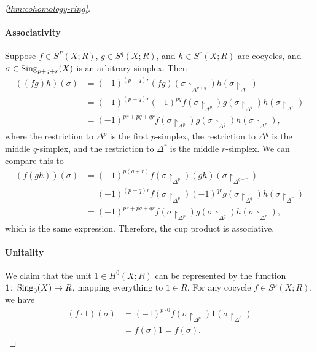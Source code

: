 \documentclass{standalone}
\begin{document}
\begin{proof}[\cref{thm:cohomology-ring}]
  \paragraph{Associativity}
  Suppose \(f \in S^P(X; R)\), \(g \in S^q(X; R)\), and \(h \in S^r(X; R)\)
  are cocycles, and \(\sigma \in \operatorname{Sing}_{p+q+r}(X)\) is an arbitrary simplex.
  Then
  \begin{align*}
    ((fg)h)(\sigma)
      &= (-1)^{(p+q)r} (fg)(\sigma{\restriction}_{\Delta^{p+q}})
                         h (\sigma{\restriction}_{\Delta^r}) \\
      &= (-1)^{(p+q)r} (-1)^{pq} f(\sigma{\restriction}_{\Delta^p})
                                 g(\sigma{\restriction}_{\Delta^q})
                                 h(\sigma{\restriction}_{\Delta^r}) \\
      &= (-1)^{pr + pq + qr} f(\sigma{\restriction}_{\Delta^p})
                             g(\sigma{\restriction}_{\Delta^q})
                             h(\sigma{\restriction}_{\Delta^r}),
  \end{align*}
  where the restriction to \(\Delta^p\) is the first \(p\)-simplex,
        the restriction to \(\Delta^q\) is the middle \(q\)-simplex, and
        the restriction to \(\Delta^r\) is the middle \(r\)-simplex.
  We can compare this to
  \begin{align*}
    (f(gh))(\sigma)
      &= (-1)^{p(q+r)}    f(\sigma{\restriction}_{\Delta^p})
                       (gh)(\sigma{\restriction}_{\Delta^{q+r}}) \\
      &= (-1)^{(p+q)r}           f(\sigma{\restriction}_{\Delta^p})
                       (-1)^{qr} g(\sigma{\restriction}_{\Delta^q})
                                 h(\sigma{\restriction}_{\Delta^r}) \\
      &= (-1)^{pr + pq + qr} f(\sigma{\restriction}_{\Delta^p})
                             g(\sigma{\restriction}_{\Delta^q})
                             h(\sigma{\restriction}_{\Delta^r}),
  \end{align*}
  which is the same expression.
  Therefore, the cup product is associative.
  

  \paragraph{Unitality}
  We claim that the unit \(1 \in H^0(X; R)\) can be represented by
  the function \(1 \colon \operatorname{Sing}_0(X) \to R\),
  mapping everything to \(1 \in R\).
  For any cocycle \(f \in S^p(X; R)\), we have
  \begin{align*}
    (f \cdot 1)(\sigma)
      &= (-1)^{p \cdot 0} f(\sigma{\restriction}_{\Delta^p})
                          1(\sigma{\restriction}_{\Delta^0}) \\
      &= f(\sigma) 1 = f(\sigma).
  \end{align*}



\end{proof}
\end{document}

